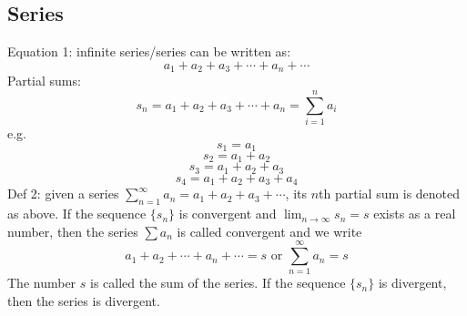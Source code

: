 \documentclass{article}
\begin{document}
\begin{multicols}{2}
    \subsection{Series}
    \begin{outline}
        \1 Equation 1: infinite series/series can be written as: \[a_1+a_2+a_3+\cdots+a_n+\cdots\]
        \1 Partial sums: \[s_n=a_1+a_2+a_3+\cdots+a_n=\sum^n_{i=1}a_i\] e.g. \[s_1=a_1\]\[s_2=a_1+a_2\]\[s_3=a_1+a_2+a_3\]\[s_4=a_1+a_2+a_3+a_4\]
        \1 Def 2: given a series \(\sum^\infty_{n=1}a_n=a_1+a_2+a_3+\cdots\), its $n$th partial sum is denoted as above.
            \2 If the sequence \(\{s_n\}\) is convergent and \(\lim_{n\to\infty}s_n=s\) exists as a real number, then the series \(\sum a_n\) is called convergent and we write \[a_1+a_2+\cdots+a_n+\cdots=s\mbox{ or }\sum^\infty_{n=1}a_n=s\]
            \2 The number $s$ is called the sum of the series. If the sequence \(\{s_n\}\) is divergent, then the series is divergent. 
        \end{outline}\end{multicols}
\end{document}
